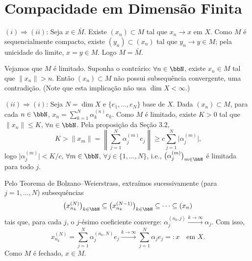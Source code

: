 
\section{Compacidade em Dimensão Finita}

\begin{myproof}
	$(i)\Rightarrow(ii)$: Seja $x\in\bar M$. Existe $(x_n)\subset M$ tal que $x_n\to x$ em $X$. Como $M$ é
	sequencialmente compacto, existe $(y_n)\subset(x_n)$ tal que $y_n\to y\in M$; pela unicidade do
	limite, $x=y\in M$. Logo $M=\bar M$.

	Vejamos que $M$ é limitado. Suponha o contrário: $\forall n\in\bbN$, existe $x_n\in M$ tal que
	$\|x_n\|>n$. Então $(x_n)\subset M$ não possui subsequência convergente, uma contradição. (Note que
	esta implicação não usa $\dim X<\infty$.)

	$(ii)\Rightarrow(i)$: Seja $N=\dim X$ e $\{e_1,\dots,e_N\}$ base de $X$. Dada $(x_n)\subset M$, para
	cada $n\in\bbN$, $x_n=\sum_{k=1}^{N}\alpha_k^{(n)}e_k$. Como $M$ é limitado, existe $K>0$ tal que
	$\|x_n\|\leq K$, $\forall n\in\bbN$. Pela proposição da Seção 3.2,
	$$K>\|x_m\|=\left\|\sum_{j=1}^{N}\alpha_j^{(m)}e_j\right\|\geq c\sum_{j=1}^{N}\big|\alpha_j^{(m)}\big|\text{,}$$
	logo $\big|\alpha_j^{(m)}\big|<K/c$, $\forall m\in\bbN$, $\forall j\in\{1,\dots,N\}$, i.e.,
	$\big(\alpha_j^{(m)}\big)_{m\in\bbN}$ é limitada para todo $j$.

	Pelo Teorema de Bolzano--Weierstrass, extraímos sucessivamente (para $j=1,\dots,N$) subsequências
	$$\big(x_{n_k}^{(N)}\big)_{k\in\bbN}\subseteq\big(x_{n_k}^{(N-1)}\big)_{k\in\bbN}\subseteq\dots\subseteq(x_n)$$
	tais que, para cada $j$, o $j$-ésimo coeficiente converge: $\alpha_j^{(n_k,j)}\xrightarrow{k\to\infty}\alpha_j$. Com isso,
	$$x_{n_k}^{(N)}=\sum_{j=1}^{N}\alpha_j^{(n_k,N)}e_j \xrightarrow{k\to\infty} \sum_{j=1}^{N}\alpha_je_j=:x
	\quad\text{em } X\text{.}$$
	Como $M$ é fechado, $x\in M$.
\end{myproof}


